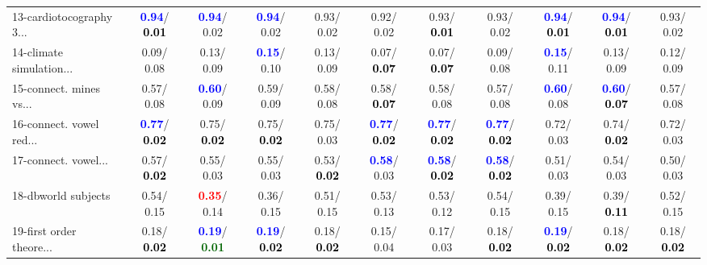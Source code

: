 \begin{table}[h]
\begin{center}
{\begin{tabular}{lc|c|c|c|c|c|c|c|c|c}
13-cardiotocography 3... & \textcolor{blue}{\textbf{  0.94}}/\textcolor{black}{\textbf{  0.01}} & \textcolor{blue}{\textbf{  0.94}}/  0.02 & \textcolor{blue}{\textbf{  0.94}}/  0.02 &   0.93/  0.02 &   0.92/  0.02 &   0.93/\textcolor{black}{\textbf{  0.01}} &   0.93/  0.02 & \textcolor{blue}{\textbf{  0.94}}/\textcolor{black}{\textbf{  0.01}} & \textcolor{blue}{\textbf{  0.94}}/\textcolor{black}{\textbf{  0.01}} &   0.93/  0.02 \\
14-climate simulation... &   0.09/  0.08 &   0.13/  0.09 & \textcolor{blue}{\textbf{  0.15}}/  0.10 &   0.13/  0.09 &   0.07/\textcolor{black}{\textbf{  0.07}} &   0.07/\textcolor{black}{\textbf{  0.07}} &   0.09/  0.08 & \textcolor{blue}{\textbf{  0.15}}/  0.11 &   0.13/  0.09 &   0.12/  0.09 \\ \hline
15-connect. mines vs... &   0.57/  0.08 & \textcolor{blue}{\textbf{  0.60}}/  0.09 &   0.59/  0.09 &   0.58/  0.08 &   0.58/\textcolor{black}{\textbf{  0.07}} &   0.58/  0.08 &   0.57/  0.08 & \textcolor{blue}{\textbf{  0.60}}/  0.08 & \textcolor{blue}{\textbf{  0.60}}/\textcolor{black}{\textbf{  0.07}} &   0.57/  0.08 \\
16-connect. vowel red... & \textcolor{blue}{\textbf{  0.77}}/\textcolor{black}{\textbf{  0.02}} &   0.75/\textcolor{black}{\textbf{  0.02}} &   0.75/\textcolor{black}{\textbf{  0.02}} &   0.75/  0.03 & \textcolor{blue}{\textbf{  0.77}}/\textcolor{black}{\textbf{  0.02}} & \textcolor{blue}{\textbf{  0.77}}/\textcolor{black}{\textbf{  0.02}} & \textcolor{blue}{\textbf{  0.77}}/\textcolor{black}{\textbf{  0.02}} &   0.72/  0.03 &   0.74/\textcolor{black}{\textbf{  0.02}} &   0.72/  0.03 \\
17-connect. vowel... &   0.57/\textcolor{black}{\textbf{  0.02}} &   0.55/  0.03 &   0.55/  0.03 &   0.53/\textcolor{black}{\textbf{  0.02}} & \textcolor{blue}{\textbf{  0.58}}/  0.03 & \textcolor{blue}{\textbf{  0.58}}/\textcolor{black}{\textbf{  0.02}} & \textcolor{blue}{\textbf{  0.58}}/\textcolor{black}{\textbf{  0.02}} &   0.51/  0.03 &   0.54/  0.03 &   0.50/  0.03 \\
18-dbworld subjects &   0.54/  0.15 & \textcolor{red}{\textbf{  0.35}}/  0.14 &   0.36/  0.15 &   0.51/  0.15 &   0.53/  0.13 &   0.53/  0.12 &   0.54/  0.15 &   0.39/  0.15 &   0.39/\textcolor{black}{\textbf{  0.11}} &   0.52/  0.15 \\
19-first order theore... &   0.18/\textcolor{black}{\textbf{  0.02}} & \textcolor{blue}{\textbf{  0.19}}/\textcolor{darkgreen}{\textbf{  0.01}} & \textcolor{blue}{\textbf{  0.19}}/\textcolor{black}{\textbf{  0.02}} &   0.18/\textcolor{black}{\textbf{  0.02}} &   0.15/  0.04 &   0.17/  0.03 &   0.18/\textcolor{black}{\textbf{  0.02}} & \textcolor{blue}{\textbf{  0.19}}/\textcolor{black}{\textbf{  0.02}} &   0.18/\textcolor{black}{\textbf{  0.02}} &   0.18/\textcolor{black}{\textbf{  0.02}} \\

\end{tabular}}
\end{center}
\end{table}
